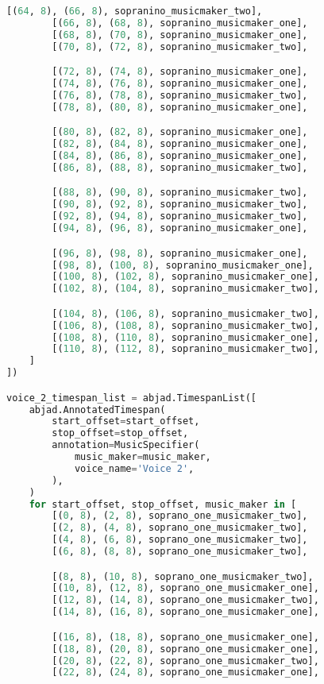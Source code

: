 \begin{lstlisting}[language=Python, caption=Invocation Source Code]
        [(64, 8), (66, 8), sopranino_musicmaker_two],
        [(66, 8), (68, 8), sopranino_musicmaker_one],
        [(68, 8), (70, 8), sopranino_musicmaker_one],
        [(70, 8), (72, 8), sopranino_musicmaker_two],

        [(72, 8), (74, 8), sopranino_musicmaker_one],
        [(74, 8), (76, 8), sopranino_musicmaker_one],
        [(76, 8), (78, 8), sopranino_musicmaker_two],
        [(78, 8), (80, 8), sopranino_musicmaker_one],

        [(80, 8), (82, 8), sopranino_musicmaker_one],
        [(82, 8), (84, 8), sopranino_musicmaker_one],
        [(84, 8), (86, 8), sopranino_musicmaker_one],
        [(86, 8), (88, 8), sopranino_musicmaker_two],

        [(88, 8), (90, 8), sopranino_musicmaker_two],
        [(90, 8), (92, 8), sopranino_musicmaker_two],
        [(92, 8), (94, 8), sopranino_musicmaker_two],
        [(94, 8), (96, 8), sopranino_musicmaker_one],

        [(96, 8), (98, 8), sopranino_musicmaker_one],
        [(98, 8), (100, 8), sopranino_musicmaker_one],
        [(100, 8), (102, 8), sopranino_musicmaker_one],
        [(102, 8), (104, 8), sopranino_musicmaker_two],

        [(104, 8), (106, 8), sopranino_musicmaker_two],
        [(106, 8), (108, 8), sopranino_musicmaker_two],
        [(108, 8), (110, 8), sopranino_musicmaker_one],
        [(110, 8), (112, 8), sopranino_musicmaker_two],
    ]
])

voice_2_timespan_list = abjad.TimespanList([
    abjad.AnnotatedTimespan(
        start_offset=start_offset,
        stop_offset=stop_offset,
        annotation=MusicSpecifier(
            music_maker=music_maker,
            voice_name='Voice 2',
        ),
    )
    for start_offset, stop_offset, music_maker in [
        [(0, 8), (2, 8), soprano_one_musicmaker_two],
        [(2, 8), (4, 8), soprano_one_musicmaker_two],
        [(4, 8), (6, 8), soprano_one_musicmaker_two],
        [(6, 8), (8, 8), soprano_one_musicmaker_two],

        [(8, 8), (10, 8), soprano_one_musicmaker_two],
        [(10, 8), (12, 8), soprano_one_musicmaker_one],
        [(12, 8), (14, 8), soprano_one_musicmaker_two],
        [(14, 8), (16, 8), soprano_one_musicmaker_one],

        [(16, 8), (18, 8), soprano_one_musicmaker_one],
        [(18, 8), (20, 8), soprano_one_musicmaker_one],
        [(20, 8), (22, 8), soprano_one_musicmaker_two],
        [(22, 8), (24, 8), soprano_one_musicmaker_one],


\end{lstlisting}
